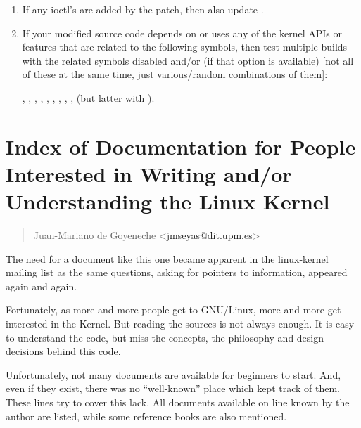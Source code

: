 \documentclass[a4paper,8pt,english]{sphinxmanual}
\begin{document}
\begin{enumerate}
\item {} 
If any ioctl's are added by the patch, then also update
.

\item {} 
If your modified source code depends on or uses any of the kernel
APIs or features that are related to the following  symbols,
then test multiple builds with the related  symbols disabled
and/or  (if that option is available) {[}not all of these at the
same time, just various/random combinations of them{]}:

, , , , , , , ,
,  (but latter with ).

\end{enumerate}


\chapter{Index of Documentation for People Interested in Writing and/or Understanding the Linux Kernel}
\label{process/kernel-docs:index-of-documentation-for-people-interested-in-writing-and-or-understanding-the-linux-kernel}\label{process/kernel-docs::doc}\label{process/kernel-docs:kernel-docs}\begin{quote}

Juan-Mariano de Goyeneche \textless{}\href{mailto:jmseyas@dit.upm.es}{jmseyas@dit.upm.es}\textgreater{}
\end{quote}

The need for a document like this one became apparent in the
linux-kernel mailing list as the same questions, asking for pointers
to information, appeared again and again.

Fortunately, as more and more people get to GNU/Linux, more and more
get interested in the Kernel. But reading the sources is not always
enough. It is easy to understand the code, but miss the concepts, the
philosophy and design decisions behind this code.

Unfortunately, not many documents are available for beginners to
start. And, even if they exist, there was no ``well-known'' place which
kept track of them. These lines try to cover this lack. All documents
available on line known by the author are listed, while some reference
books are also mentioned.
\end{document}
